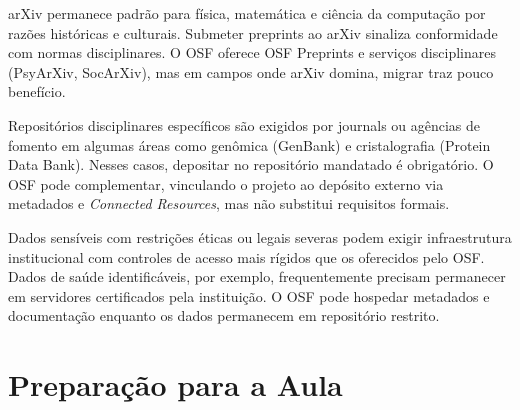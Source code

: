 \documentclass[
  a4paper,
]{book}
\begin{document}
arXiv permanece padrão para física, matemática e ciência da computação
por razões históricas e culturais. Submeter preprints ao arXiv sinaliza
conformidade com normas disciplinares. O OSF oferece OSF Preprints e
serviços disciplinares (PsyArXiv, SocArXiv), mas em campos onde arXiv
domina, migrar traz pouco benefício.

Repositórios disciplinares específicos são exigidos por journals ou
agências de fomento em algumas áreas como genômica (GenBank) e
cristalografia (Protein Data Bank). Nesses casos, depositar no
repositório mandatado é obrigatório. O OSF pode complementar, vinculando
o projeto ao depósito externo via metadados e \emph{Connected
Resources}, mas não substitui requisitos formais.

Dados sensíveis com restrições éticas ou legais severas podem exigir
infraestrutura institucional com controles de acesso mais rígidos que os
oferecidos pelo OSF. Dados de saúde identificáveis, por exemplo,
frequentemente precisam permanecer em servidores certificados pela
instituição. O OSF pode hospedar metadados e documentação enquanto os
dados permanecem em repositório restrito.

\section{Preparação para a Aula}\label{preparauxe7uxe3o-para-a-aula-1}
\end{document}
